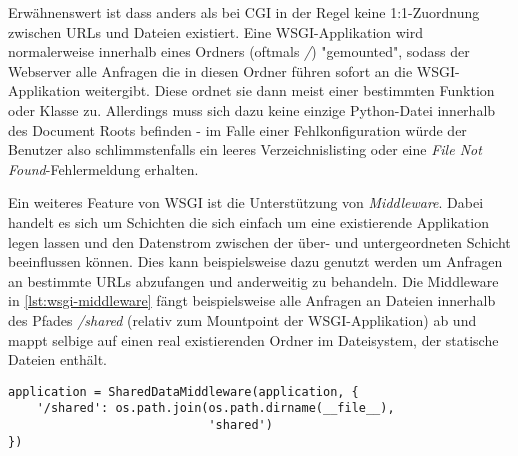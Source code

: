 Erwähnenswert ist dass anders als bei CGI in der Regel keine 1:1-Zuordnung zwischen URLs und Dateien
existiert. Eine WSGI-Applikation wird normalerweise innerhalb eines Ordners (oftmals \emph{/})
"gemounted", sodass der Webserver alle Anfragen die in diesen Ordner führen sofort an die
WSGI-Applikation weitergibt. Diese ordnet sie dann meist einer bestimmten Funktion oder Klasse zu.
Allerdings muss sich dazu keine einzige Python-Datei innerhalb des Document Roots befinden - im
Falle einer Fehlkonfiguration würde der Benutzer also schlimmstenfalls ein leeres Verzeichnislisting
oder eine \emph{File Not Found}-Fehlermeldung erhalten.

Ein weiteres Feature von WSGI ist die Unterstützung von \emph{Middleware}. Dabei handelt es sich um
Schichten die sich einfach um eine existierende Applikation legen lassen und den Datenstrom
zwischen der über- und untergeordneten Schicht beeinflussen können. Dies kann beispielsweise dazu
genutzt werden um Anfragen an bestimmte URLs abzufangen und anderweitig zu behandeln. Die Middleware
in \autoref{lst:wsgi-middleware} fängt beispielsweise alle Anfragen an Dateien innerhalb des Pfades
\emph{/shared} (relativ zum Mountpoint der WSGI-Applikation) ab und mappt selbige auf einen real
existierenden Ordner im Dateisystem, der statische Dateien enthält.

\begin{lstlisting}[caption=WSGI-Middleware,label=lst:wsgi-middleware]
application = SharedDataMiddleware(application, {
    '/shared': os.path.join(os.path.dirname(__file__),
                            'shared')
})
\end{lstlisting}
